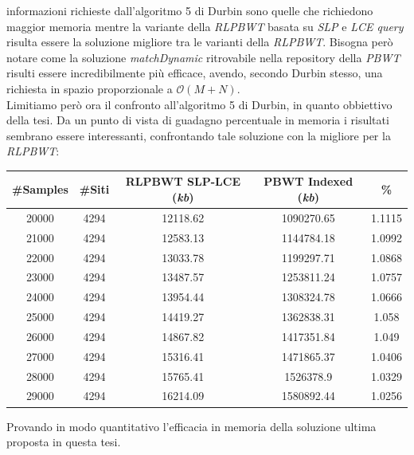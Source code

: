 informazioni richieste dall'algoritmo 5 di Durbin sono quelle che richiedono
maggior memoria mentre la variante della \textit{RLPBWT} basata su \textit{SLP}
e \textit{LCE query} risulta essere la soluzione migliore tra le varianti della
\textit{RLPBWT}. Bisogna però notare come la soluzione \textit{matchDynamic}
ritrovabile nella repository della \textit{PBWT} risulti essere incredibilmente
più efficace, avendo, secondo Durbin stesso, una richiesta in spazio
proporzionale a $\mathcal{O}(M+N)$. \\
Limitiamo però ora il confronto all'algoritmo 5 di Durbin, in quanto obbiettivo
della tesi. Da un punto di vista di guadagno percentuale in memoria i risultati
sembrano essere interessanti, confrontando tale soluzione con la migliore per la
\textit{RLPBWT}:
\begin{table}[H]
  \centering
  \footnotesize
  \begin{tabular}{c|c|c|c|c}
    \textbf{\#Samples} & \textbf{\#Siti}
    & \textbf{RLPBWT SLP-LCE (\textit{kb})}
    & \textbf{PBWT Indexed (\textit{kb})} & \textbf{\%}\\
    \hline
    20000 & 4294 & 12118.62 & 1090270.65 & 1.1115\\
    21000 & 4294 & 12583.13 & 1144784.18 & 1.0992\\
    22000 & 4294 & 13033.78 & 1199297.71 & 1.0868\\
    23000 & 4294 & 13487.57 & 1253811.24 & 1.0757\\
    24000 & 4294 & 13954.44 & 1308324.78 & 1.0666\\
    25000 & 4294 & 14419.27 & 1362838.31 & 1.058\\
    26000 & 4294 & 14867.82 & 1417351.84 & 1.049\\
    27000 & 4294 & 15316.41 & 1471865.37 & 1.0406\\
    28000 & 4294 & 15765.41 & 1526378.9 & 1.0329\\
    29000 & 4294 & 16214.09 & 1580892.44 & 1.0256\\
  \end{tabular}
\end{table}
Provando in modo quantitativo l'efficacia in memoria della soluzione ultima
proposta in questa tesi.

